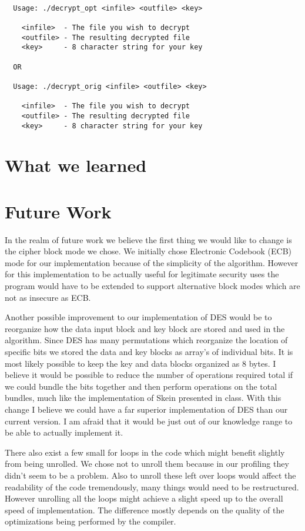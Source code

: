 \documentclass[10pt]{article}
\begin{document}
\begin{verbatim}

  Usage: ./decrypt_opt <infile> <outfile> <key>

    <infile>  - The file you wish to decrypt
    <outfile> - The resulting decrypted file
    <key>     - 8 character string for your key

  OR

  Usage: ./decrypt_orig <infile> <outfile> <key>

    <infile>  - The file you wish to decrypt
    <outfile> - The resulting decrypted file
    <key>     - 8 character string for your key

\end{verbatim}

\section{What we learned}

\section{Future Work}

  In the realm of future work we believe the first thing we would like to change is the cipher block mode we chose.
  We initially chose Electronic Codebook (ECB) mode for our implementation because of the simplicity of the algorithm.
  However for this implementation to be actually useful for legitimate security uses the program would have to be extended
  to support alternative block modes which are not as insecure as ECB.

  Another possible improvement to our implementation of DES would be to reorganize how the data input block and key block
  are stored and used in the algorithm. Since DES has many permutations which reorganize the location of specific bits we 
  stored the data and key blocks as array's of individual bits. It is most likely possible to keep the key and data blocks
  organized as 8 bytes. I believe it would be possible to reduce the number of operations required total if we could bundle the 
  bits together and then perform operations on the total bundles, much like the implementation of Skein presented in class. 
  With this change I believe we could have a far superior implementation of DES than our current version. I am afraid that it
  would be just out of our knowledge range to be able to actually implement it. 

  There also exist a few small for loops in the code which might benefit slightly from being unrolled.
  We chose not to unroll them because in our profiling they didn't seem to be a problem. Also to unroll
  these left over loops would affect the readability of the code tremendously, many things would need to be 
  restructured. However unrolling all the loops might achieve a slight speed up to the overall speed of implementation.
  The difference mostly depends on the quality of the optimizations being performed by the compiler.
\end{document}
